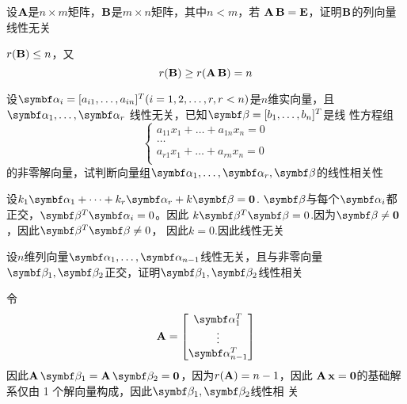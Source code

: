 \documentclass{article}
\begin{document}
\begin{examplle}[]
设\(\operatorname{\textbf{A}}\)是\(n\times m\)矩阵，\(\operatorname{\textbf{B}}\)是\(m\times n\)矩阵，其中\(n<m\)，若
\(\operatorname{\textbf{A}}\operatorname{\textbf{B}}=\operatorname{\textbf{E}}\)，证明\(\operatorname{\textbf{B}}\)的列向量线性无关

\(r(\operatorname{\textbf{B}})\le n\)，又
\begin{equation*}
r(\operatorname{\textbf{B}})\ge r(\operatorname{\textbf{A}}\operatorname{\textbf{B}})=n
\end{equation*}
\end{examplle}

\begin{examplle}[]
设\(\balpha_i=[a_{i1},\dots,a_{in}]^T(i=1,2,\dots,r,r<n)\)是\(n\)维实向量，且
\(\balpha_1,\dots,\balpha_r\) 线性无关，已知\(\bbeta=[b_1,\dots,b_n]^T\)是线
性方程组
\begin{equation*}
\begin{cases}
a_{11}x_1+\dots+a_{1n}x_n=0\\
\dots\\
a_{r1}x_1+\dots+a_{rn}x_n=0\\
\end{cases}
\end{equation*}
的非零解向量，试判断向量组\(\balpha_1,\dots,\balpha_r,\bbeta\)的线性相关性

设\(k_1\balpha_1+\dots+k_r\balpha_r+k\bbeta=\bzero\).
\(\bbeta\)与每个\(\balpha_i\)都正交，\(\bbeta^T\balpha_i=0\)。因此
\(k\bbeta^T\bbeta=0\).因为\(\bbeta\neq\bzero\)，因此\(\bbeta^T\bbeta\neq0\)，
因此\(k=0\).因此线性无关
\end{examplle}

\begin{examplle}[]
设\(n\)维列向量\(\balpha_1,\dots,\balpha_{n-1}\)线性无关，且与非零向量
\(\bbeta_1,\bbeta_2\)正交，证明\(\bbeta_1,\bbeta_2\)线性相关

令
\begin{equation*}
\bA=
\begin{bmatrix}
\balpha_1^T\\\vdots\\\balpha_{n-1}^T
\end{bmatrix}
\end{equation*}
因此\(\bA\bbeta_1=\bA\bbeta_2=\bzero\)，因为\(r(\operatorname{\textbf{A}})=n-1\)，因此
\(\operatorname{\textbf{A}}\operatorname{\textbf{x}}=\mathbf{0}\)的基础解系仅由 1 个解向量构成，因此\(\bbeta_1,\bbeta_2\)线性相
关
\end{examplle}
\end{document}
